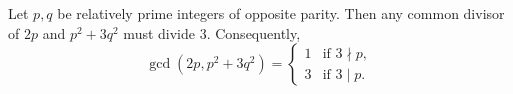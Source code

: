 Let $p, q$ be relatively prime integers of opposite parity. Then any common divisor of $2p$ and $p^2 + 3q^2$ must divide $3$. Consequently,
$$\gcd(2p, p^2 + 3q^2) = \begin{cases} 1 & \text{if } 3 \nmid p, \\ 3 & \text{if } 3 \mid p. \end{cases}$$

